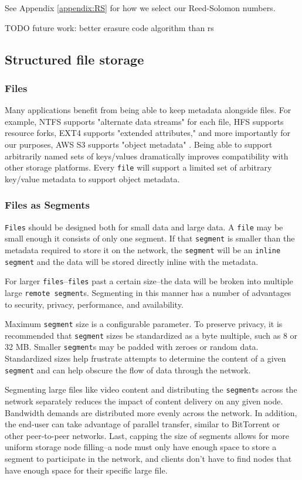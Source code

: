 \documentclass[a4paper,10pt]{article} \usepackage[utf8]{inputenc}
\newcommand{\x}[1]{{\tt #1}} \newcommand{\code}[1]{{\tt #1}}
\newcommand{\todo}[1]{{\color{red} TODO #1 }}
\begin{document}
See Appendix \ref{appendix:RS} for how we select our Reed-Solomon numbers.

\todo{future work: better erasure code algorithm than rs}

\subsection{Structured file storage}

\subsubsection{Files}

Many applications benefit from being able to keep metadata alongside files. For
example, NTFS supports "alternate data streams" for each file, HFS supports
resource forks, EXT4 supports "extended attributes," and more importantly for
our purposes, AWS S3 supports "object metadata" \cite{s3-object-meta}. Being
able to support arbitrarily named sets of keys/values dramatically improves
compatibility with other storage platforms. Every \x{file} will support a
limited set of arbitrary key/value metadata to support object metadata.

\subsubsection{Files as Segments}

\x{Files} should be designed both for small data and large data.
A \x{file} may be small enough it consists of only one segment.
If that \x{segment} is smaller than the metadata required to store it on the
network, the \x{segment} will be an \x{inline segment} and the data will be
stored directly inline with the metadata.

For larger \x{files}--\x{files} past a certain size--the data will be broken
into multiple large \x{remote segment}s. Segmenting in this manner has a
number of advantages to security, privacy, performance, and availability.

Maximum \x{segment} size is a configurable parameter. To preserve privacy, it is
recommended that \x{segment} sizes be standardized as a byte multiple, such as 8
or 32 MB. Smaller \x{segment}s may be padded with zeroes or random data.
Standardized sizes help frustrate attempts to determine the content of a given
\x{segment} and can help obscure the flow of data through the network.

Segmenting large files like video content and distributing the \x{segment}s
across the network separately reduces the impact of content delivery on any
given node.
Bandwidth demands are distributed more evenly across the network.
In addition, the end-user can take advantage of parallel transfer, similar to
BitTorrent or other peer-to-peer networks. Last, capping the size of segments
allows for more uniform storage node filling--a node must only have enough
space to store a segment to participate in the network, and clients don't have
to find nodes that have enough space for their specific large file.
\end{document}
